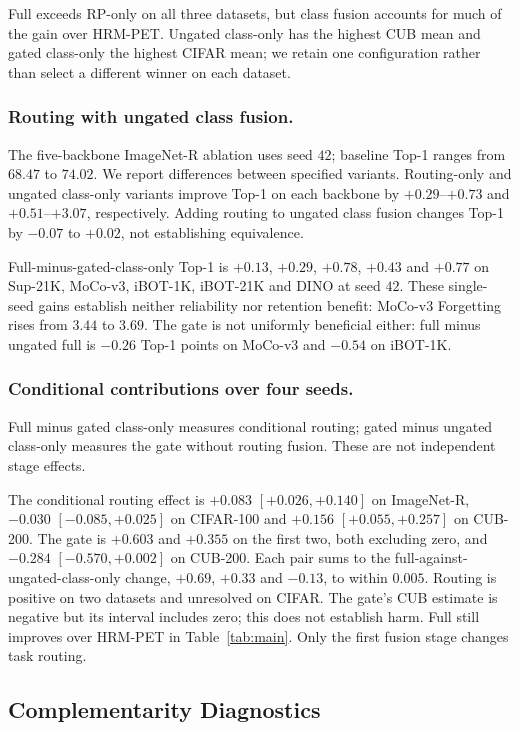 \documentclass[runningheads]{llncs}
\begin{document}
Full exceeds RP-only on all three datasets, but class fusion accounts for much
of the gain over HRM-PET. Ungated class-only has the highest CUB mean and
gated class-only the highest CIFAR mean; we retain one configuration rather
than select a different winner on each dataset.

\subsubsection{Routing with ungated class fusion.}
The five-backbone ImageNet-R ablation uses seed $42$; baseline Top-1 ranges
from $68.47$ to $74.02$. We report differences between specified variants.
Routing-only and ungated class-only variants improve Top-1 on each
backbone by $+0.29$--$+0.73$ and $+0.51$--$+3.07$, respectively.
Adding routing to ungated class fusion changes Top-1 by $-0.07$ to $+0.02$,
not establishing equivalence.

Full-minus-gated-class-only Top-1 is $+0.13$, $+0.29$, $+0.78$,
$+0.43$ and $+0.77$ on Sup-21K, MoCo-v3, iBOT-1K, iBOT-21K and DINO at seed $42$.
These single-seed gains establish neither reliability nor retention benefit:
MoCo-v3 Forgetting rises from $3.44$ to $3.69$.
The gate is not uniformly beneficial either: full minus ungated full is
$-0.26$ Top-1 points on MoCo-v3 and $-0.54$ on iBOT-1K.

\subsubsection{Conditional contributions over four seeds.}
Full minus gated class-only
measures conditional routing; gated minus ungated class-only measures the gate
without routing fusion. These are not independent stage effects.

The conditional routing effect is $+0.083$ $[+0.026, +0.140]$ on ImageNet-R, $-0.030$
$[-0.085, +0.025]$ on CIFAR-100 and $+0.156$ $[+0.055, +0.257]$ on CUB-200. The
gate is $+0.603$ and $+0.355$ on the first two, both excluding zero, and
$-0.284$ $[-0.570, +0.002]$ on CUB-200. Each pair sums to the
full-against-ungated-class-only change, $+0.69$, $+0.33$ and $-0.13$, to within
$0.005$. Routing is positive on two datasets and unresolved on CIFAR.
The gate's CUB estimate is negative but its interval includes zero; this does
not establish harm. Full still improves over HRM-PET in Table~\ref{tab:main}.
Only the first fusion stage changes task routing.

\subsection{Complementarity Diagnostics}
\label{sec:diagnostics}
\end{document}
